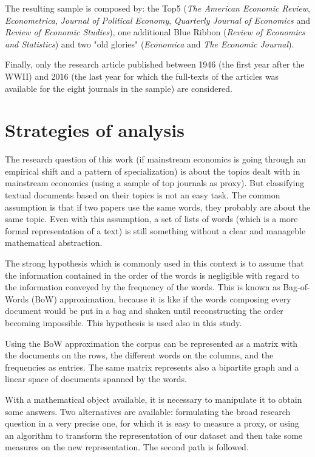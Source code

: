 \documentclass[a4paper, 11pt, headings=standardclasses, tablecaptionsbelow]{scrartcl}
\begin{document}
The resulting sample is composed by: the Top5 (\textit{The American Economic Review}, \textit{Econometrica}, \textit{Journal of Political Economy}, \textit{Quarterly Journal of Economics} and \textit{Review of Economic Studies}), one additional Blue Ribbon (\textit{Review of Economics and Statistics}) and two "old glories" (\textit{Economica} and \textit{The Economic Journal}).

Finally, only the research article published between 1946 (the first year after the WWII) and 2016 (the last year for which the full-texts of the articles was available for the eight journals in the sample) are considered.

\section{Strategies of analysis}
The research question of this work (if mainstream economics is going through an empirical shift and a pattern of specialization) is about the topics dealt with in mainstream economics (using a sample of top journals as proxy).
But classifying textual documents based on their topics is not an easy task. The common assumption is that if two papers use the same words, they probably are about the same topic. Even with this assumption, a set of lists of words (which is a more formal representation of a text) is still something without a clear and manageble mathematical abstraction.

The strong hypothesis which is commonly used in this context is to assume that the information contained in the order of the words is negligible with regard to the information conveyed by the frequency of the words.
This is known as Bag-of-Words (BoW) approximation, because it is like if the words composing every document would be put in a bag and shaken until reconstructing the order becoming impossible. This hypothesis is used also in this study. %

Using the BoW approximation the corpus can be represented as a matrix with the documents on the rows, the different words on the columns, and the frequencies as entries. The same matrix represents also a bipartite graph and a linear space of documents spanned by the words.

With a mathematical object available, it is necessary to manipulate it to obtain some answers. Two alternatives are available: formulating the broad research question in a very precise one, for which it is easy to measure a proxy, or using an algorithm to transform the representation of our dataset and then take some measures on the new representation. The second path is followed.
\end{document}
